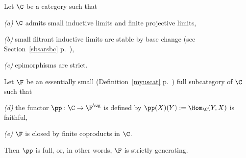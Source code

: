 \documentclass[12pt]{article}
\theoremstyle{remark}
\theoremstyle{definition}
\begin{document}



\begin{thm}[Theorem 5.3.6 p.~124] 
Let $\C$ be a category such that%

\nn\emph{(a)} $\C$ admits small inductive limits and finite projective limits, 

\nn\emph{(b)} small filtrant inductive limits are stable by base change (see Section~\ref{sbsarsbc} p.~), 

\nn\emph{(c)} epimorphisms are strict. 

\nn Let $\F$ be an essentially small (Definition~\ref{myuscat} p.~) full subcategory of $\C$ such that 

\nn\emph{(d)} the functor $\pp:\C\to\F^\wg$ is defined by $\pp(X)(Y):=\Hom_\C(Y,X)$ is faithful,

\nn\emph{(e)} $\F$ is closed by finite coproducts in $\C$. 

\nn Then $\pp$ is full, or, in other words, $\F$ is strictly generating.
\end{thm}

\end{document}
